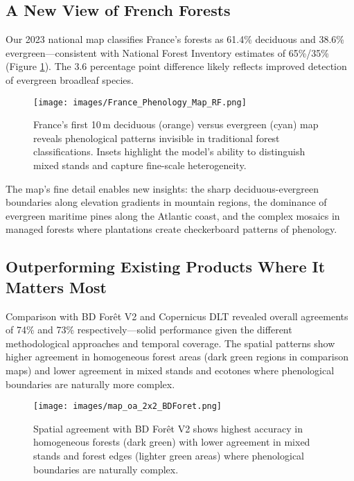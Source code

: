 \documentclass[utf8]{FrontiersinHarvard}
\begin{document}
\subsection{A New View of French Forests}

Our 2023 national map classifies France's forests as 61.4\% deciduous and 38.6\% evergreen—consistent with National Forest Inventory estimates of 65\%/35\% (Figure \ref{fig:national_map}). The 3.6 percentage point difference likely reflects improved detection of evergreen broadleaf species.

\begin{figure}[H]
    \centering
    \texttt{[image: images/France\_Phenology\_Map\_RF.png]}
    \caption{France's first 10\,m deciduous (orange) versus evergreen (cyan) map reveals phenological patterns invisible in traditional forest classifications. Insets highlight the model's ability to distinguish mixed stands and capture fine-scale heterogeneity.}
    \label{fig:national_map}
\end{figure}

The map's fine detail enables new insights: the sharp deciduous-evergreen boundaries along elevation gradients in mountain regions, the dominance of evergreen maritime pines along the Atlantic coast, and the complex mosaics in managed forests where plantations create checkerboard patterns of phenology.

\subsection{Outperforming Existing Products Where It Matters Most}

Comparison with BD Forêt V2 and Copernicus DLT revealed overall agreements of 74\% and 73\% respectively—solid performance given the different methodological approaches and temporal coverage. The spatial patterns show higher agreement in homogeneous forest areas (dark green regions in comparison maps) and lower agreement in mixed stands and ecotones where phenological boundaries are naturally more complex.

\begin{figure}[H]
    \centering
    \texttt{[image: images/map\_oa\_2x2\_BDForet.png]}
    \caption{Spatial agreement with BD Forêt V2 shows highest accuracy in homogeneous forests (dark green) with lower agreement in mixed stands and forest edges (lighter green areas) where phenological boundaries are naturally complex.}
    \label{fig:agreement_bdf}
\end{figure}
\end{document}
